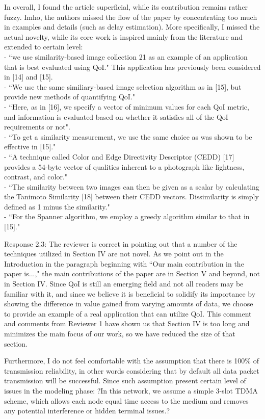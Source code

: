 \documentclass[12pt, letterpaper, onecolumn]{IEEEtran}
\begin{document}
In overall, I found the article superficial, while its contribution remains rather fuzzy. Imho, the authors missed the flow of the paper by concentrating too much in examples and details (such as delay estimation). More specifically, I missed the actual novelty, while its core work is inspired mainly from the literature and extended to certain level: \\
- ``we use similarity-based image collection 21 as an example of an application that is best evaluated using QoI." This application has previously been considered in [14] and [15]. \\
- ``We use the same similiary-based image selection algorithm as in [15], but provide new methods of quantifying QoI." \\
- ``Here, as in [16], we specify a vector of minimum values for each QoI metric, and information is evaluated based on whether it satisfies all of the QoI requirements or not". \\
- ``To get a similarity measurement, we use the same choice as was shown to be effective in [15]." \\
- ``A technique called Color and Edge Directivity Descriptor (CEDD) [17] provides a 54-byte vector of qualities inherent to a photograph like lightness, contrast, and color." \\
- ``The similarity between two images can then be given as a scalar by calculating the Tanimoto Similarity [18] between their CEDD vectors. Dissimilarity is simply defined as 1 minus the similarity." \\
- ``For the Spanner algorithm, we employ a greedy algorithm similar to that in [15]." 

{\color{blue}
Response 2.3: The reviewer is correct in pointing out that a number of the techniques utilized in Section IV are not novel. As we point out in the Introduction in the paragraph beginning with ``Our main contribution in the paper is...," the main contributions of the paper are in Section V and beyond, not in Section IV. Since QoI is still an emerging field and not all readers may be familiar with it, and since we believe it is beneficial to solidify its importance by showing the difference in value gained from varying amounts of data, we choose to provide an example of a real application that can utilize QoI. This comment and comments from Reviewer 1 have shown us that Section IV is too long and minimizes the main focus of our work, so we have reduced the size of that section.
}

Furthermore, I do not feel comfortable with the assumption that there is 100\% of transmission reliability, in other words considering that by default all data packet transmission will be successful. Since such assumption present certain level of issues in the modeling phase: ?In this network, we assume a simple 3-slot TDMA scheme, which allows each node equal time access to the medium and removes any potential interference or hidden terminal issues.? 
\end{document}
